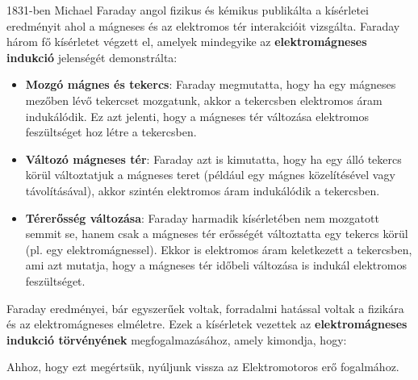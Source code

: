 \documentclass[a4paper,12pt]{article}
\begin{document}
1831-ben Michael Faraday angol fizikus és kémikus publikálta a kísérletei eredményit ahol a mágneses és az elektromos tér interakcióit vizsgálta. Faraday három fő kísérletet végzett el, amelyek mindegyike az \textbf{elektromágneses indukció} jelenségét demonstrálta:
\begin{itemize}
    \item \textbf{Mozgó mágnes és tekercs}: Faraday megmutatta, hogy ha egy mágneses mezőben lévő tekercset mozgatunk, akkor a tekercsben elektromos áram indukálódik. Ez azt jelenti, hogy a mágneses tér változása elektromos feszültséget hoz létre a tekercsben.
    
    \item \textbf{Változó mágneses tér}: Faraday azt is kimutatta, hogy ha egy álló tekercs körül változtatjuk a mágneses teret (például egy mágnes közelítésével vagy távolításával), akkor szintén elektromos áram indukálódik a tekercsben.
    
    \item \textbf{Térerősség változása}: Faraday harmadik kísérletében nem mozgatott semmit se, hanem csak a mágneses tér erősségét változtatta egy tekercs körül (pl. egy elektromágnessel). Ekkor is elektromos áram keletkezett a tekercsben, ami azt mutatja, hogy a mágneses tér időbeli változása is indukál elektromos feszültséget.
\end{itemize}
Faraday eredményei, bár egyszerűek voltak, forradalmi hatással voltak a fizikára és az elektromágneses elméletre. Ezek a kísérletek vezettek az \textbf{elektromágneses indukció törvényének} megfogalmazásához, amely kimondja, hogy:
\begin{quote}
\end{quote}
Ahhoz, hogy ezt megértsük, nyúljunk vissza az Elektromotoros erő fogalmához.
\end{document}
